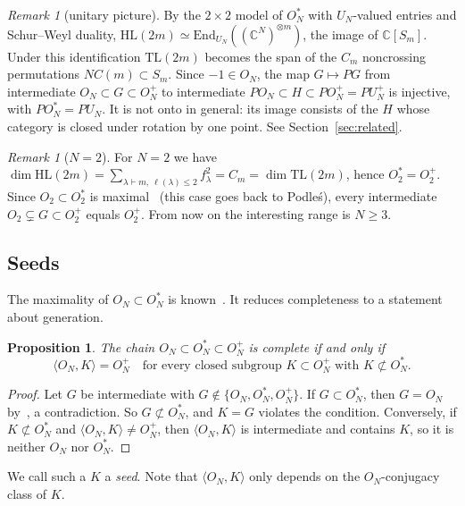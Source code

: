 \documentclass[11pt]{amsart}
\newtheorem{proposition}[theorem]{Proposition}
\theoremstyle{definition}
\theoremstyle{remark}
\newtheorem{remark}[theorem]{Remark}
\theoremstyle{plain}
\numberwithin{equation}{section}
\numberwithin{table}{section}
\newcommand{\C}{\mathbb C}
\newcommand{\TL}{\mathrm{TL}}
\newcommand{\HL}{\mathrm{HL}}
\begin{document}
\begin{remark}[unitary picture]\label{rem:unitarypic}
By the $2\times2$ model of $O_N^*$ with $U_N$-valued entries and Schur--Weyl duality,
$\HL(2m)\simeq\mathrm{End}_{U_N}((\C^N)^{\otimes m})$, the image of $\C[S_m]$. Under this identification
$\TL(2m)$ becomes the span of the $C_m$ noncrossing permutations $NC(m)\subset S_m$. Since $-1\in O_N$,
the map $G\mapsto PG$ from intermediate $O_N\subset G\subset O_N^+$ to intermediate
$PO_N\subset H\subset PO_N^+=PU_N^+$ is injective, with $PO_N^*=PU_N$. It is not onto in general: its image consists of the
$H$ whose category is closed under rotation by one point. See Section~\ref{sec:related}.
\end{remark}

\begin{remark}[$N=2$]\label{rem:ntwo}
For $N=2$ we have $\dim\HL(2m)=\sum_{\lambda\vdash m,\ \ell(\lambda)\le2}f_\lambda^2=C_m=\dim\TL(2m)$, hence
$O_2^*=O_2^+$. Since $O_2\subset O_2^*$ is maximal~\cite{bbcc} (this case goes back to Podle\'s), every intermediate
$O_2\subsetneq G\subset O_2^+$ equals $O_2^+$. From now on the interesting range is $N\ge3$.
\end{remark}

\subsection{Seeds}

The maximality of $O_N\subset O_N^*$ is known~\cite{bbcc}. It reduces completeness to a statement about generation.

\begin{proposition}\label{prop:seeds}
The chain $O_N\subset O_N^*\subset O_N^+$ is complete if and only if
\[
\langle O_N,K\rangle=O_N^+\quad\text{for every closed subgroup }K\subset O_N^+\text{ with }K\not\subset O_N^*.
\]
\end{proposition}

\begin{proof}
Let $G$ be intermediate with $G\notin\{O_N,O_N^*,O_N^+\}$. If $G\subset O_N^*$, then $G=O_N$ by~\cite{bbcc}, a
contradiction. So $G\not\subset O_N^*$, and $K=G$ violates the condition. Conversely, if $K\not\subset O_N^*$ and
$\langle O_N,K\rangle\ne O_N^+$, then $\langle O_N,K\rangle$ is intermediate and contains $K$, so it is neither $O_N$ nor
$O_N^*$.
\end{proof}

We call such a $K$ a \emph{seed}. Note that $\langle O_N,K\rangle$ only depends on the $O_N$-conjugacy class of $K$.
\end{document}
